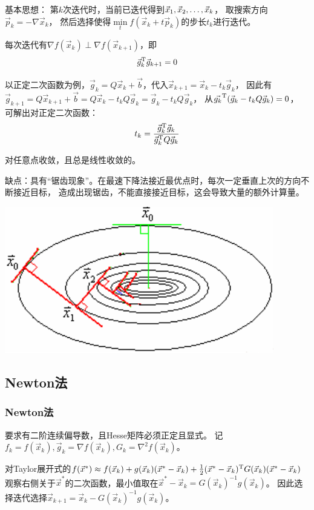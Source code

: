 基本思想：
第$k$次迭代时，当前已迭代得到$\VectorComma{\vec{x}}{k}$，
取搜索方向$\vec{p}_k=-\nabla \vec{x}_k$，
然后选择使得$\min\limits_t f(\vec{x}_k + t \vec{p}_k)$的步长$t_k$进行迭代。

\begin{property}
    每次迭代有$\nabla f(\vec{x}_k)\perp \nabla f(\vec{x}_{k+1})$，即
    \[
        \vec{g}_k^\mathrm{T}\vec{g}_{k+1} = 0
    \]
\end{property}

以正定二次函数为例，$\vec{g}_k=Q\vec{x}_k+\vec{b}$，代入$\vec{x}_{k+1}=\vec{x}_k-t_k\vec{g}_k$，
因此有$\vec{g}_{k+1} = Q\vec{x}_{k+1}+\vec{b} = Q\vec{x}_k - t_k Q \vec{g}_k = \vec{g}_k - t_k Q \vec{g}_k$，
从$\vec{g_k}^\mathrm{T} (\vec{g}_k - t_k Q \vec{g}_k) = 0$，
可解出对正定二次函数：
\[
    t_k=\frac{\vec{g}_k^\mathrm{T}\vec{g}_k}{\vec{g}_k^\mathrm{T} Q \vec{g}_k}
\]

\begin{property}[收敛性]
    对任意点收敛，且总是线性收敛的。
\end{property}

缺点：具有``锯齿现象''。在最速下降法接近最优点时，每次一定垂直上次的方向不断接近目标，
造成出现锯齿，不能直接接近目标，这会导致大量的额外计算量。

\begin{center}
    \includegraphics[width=.6\linewidth]{fig/zuisuxiajiangfa.png}
\end{center}

\subsection{Newton法}
\subsubsection{Newton法}

要求有二阶连续偏导数，且Hesse矩阵必须正定且显式。
记$f_k=f(\vec{x}_k),\vec{g}_k=\nabla f(\vec{x}_k),G_k=\nabla^2 f(\vec{x}_k)$。

对Taylor展开式的$f(\vec{x}^*)\approx f(\vec{x}_k)+g(\vec{x}_k)(\vec{x}^*-\vec{x}_k)+\frac{1}{2}(\vec{x}^*-\vec{x}_k)^\mathrm{T} G(\vec{x}_k) (\vec{x}^*-\vec{x}_k)$
观察右侧关于$\vec{x}^*$的二次函数，最小值取在$\vec{x}^*-\vec{x}_k = G(\vec{x}_k)^{-1} g(\vec{x}_k)$。
因此选择迭代选择$\vec{x}_{k+1} = \vec{x}_k - G(\vec{x}_k)^{-1}g(\vec{x}_k)$。

